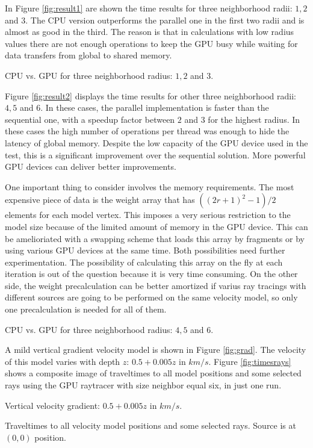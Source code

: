 In Figure \ref{fig:result1} are shown the time results
for three neighborhood radii: $1,2$ and $3$. The CPU 
version outperforms the parallel one in the first two
radii and is almost as good in the third. The reason is
that in calculations with low radius values there 
are not enough operations to keep the GPU busy while waiting
for data transfers from global to shared memory.

{CPU vs. GPU for three neighborhood radius: $1,2$ and $3$.}

Figure \ref{fig:result2} displays the time results
for other three neighborhood radii: $4,5$ and $6$.
In these cases, the parallel implementation is faster
than the sequential one, with a speedup factor between
$2$ and $3$ for the highest radius. In these cases the 
high number of operations per thread was enough to
hide the latency of global memory. Despite the low capacity
of the GPU device used in the test, this is a significant 
improvement over the sequential solution. More powerful
GPU devices can deliver better improvements.

One important thing to consider involves the memory requirements.
The most expensive piece of data is the weight array that
has $((2r+1)^2-1)/2$ elements for each model vertex. This imposes
a very serious restriction to the model size because of the limited
amount of memory in the GPU device. This can be amelioriated 
with a swapping scheme that loads this array by fragments or
by using various GPU devices at the same time. Both possibilities
need further experimentation. The possibility of calculating
this array on the fly at each iteration is out of the question
because it is very time consuming. On the other side,
the weight precalculation can be better amortized if varius ray 
tracings with different sources are going to be performed on 
the same velocity model, so only one precalculation is needed 
for all of them.

{CPU vs. GPU for three neighborhood radius: $4,5$ and $6$.}

A mild vertical gradient velocity model is shown in Figure \ref{fig:grad}.
The velocity of this model varies with depth $z$: $0.5+0.005z$ in $km/s$.
Figure \ref{fig:timesrays} shows a composite image of traveltimes to all
model positions and some selected rays using the GPU raytracer
with size neighbor equal six, in just one run. 
\onecolumn

{Vertical velocity gradient: $0.5+0.005z$ in $km/s$.}


{Traveltimes to all velocity model positions and some selected rays. Source is
at $(0,0)$ position.}



